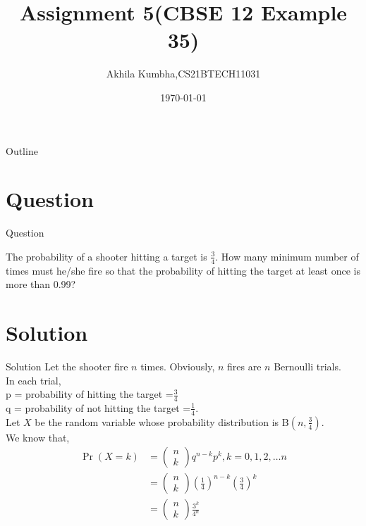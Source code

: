 \documentclass{beamer}
\title{Assignment 5(CBSE 12 Example 35)}
\author{Akhila Kumbha,CS21BTECH11031}
\date{\today}
\providecommand{\brak}[1]{\ensuremath{\left(#1\right)}}
\newcommand{\myvec}[1]{\ensuremath{\begin{pmatrix}#1\end{pmatrix}}}
\providecommand{\pr}[1]{\ensuremath{\Pr\left(#1\right)}}
\begin{document}
\begin{frame}
    \titlepage 
\end{frame}

\logo{}

\begin{frame}{Outline}
    \tableofcontents
\end{frame}


\section{Question}
\begin{frame}{Question}

The probability of a shooter hitting a target is $\frac{3}{4}$. How many minimum
number of times must he/she fire so that the probability of hitting the target at least
once is more than 0.99?\\

\end{frame}


\section{Solution}
\begin{frame}{Solution}
Let the shooter fire $n$ times. Obviously, $n$ fires are $n$ Bernoulli trials.\\
In each trial,\\
p = probability of hitting the target =$\frac{3}{4}$ \\
q = probability of not hitting the target =$\frac{1}{4}$.\\

Let $X$ be the random variable whose probability distribution is B\brak{n,\frac{3}{4}}.\\
We know that,
\begin{align}
\pr{X=k}&=\myvec{n \\ k}q^{n-k}p^k ,k=0,1,2,\dots n\\
    &=\myvec{n \\ k}\brak{\frac{1}{4}}^{n-k}\brak{\frac{3}{4}}^k\\
    &=\myvec{n \\ k}\frac{3^k}{4^n}
\end{align}
\end{frame} 
\end{document}
